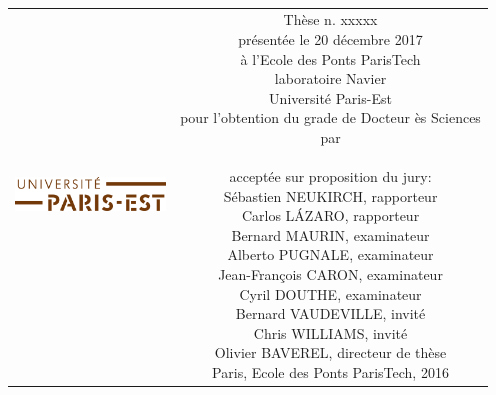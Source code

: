 \begin{titlepage}
\begin{center}


\null\vspace{2cm}
{
{\ttfamily\huge \mytitle} \\[24pt] 
}    
\vfill

\begin{tabular} {cc}
\parbox{0.3\textwidth}{\includegraphics[width=4cm]{head/logo_upe}}
&
\parbox{0.7\textwidth}{%
	Thèse n. xxxxx\\
	présentée le 20 décembre 2017\\
	à l'Ecole des Ponts ParisTech\\
	laboratoire Navier\\
%
	Université Paris-Est\\[6pt]
	pour l'obtention du grade de Docteur ès Sciences\\
	par\\ [4pt]
	\null \hspace{3em} \myauthor\\[9pt]
%
\small
acceptée sur proposition du jury:\\[4pt]
%
    Sébastien NEUKIRCH, rapporteur\\
    Carlos LÁZARO, rapporteur\\
    Bernard MAURIN, examinateur\\
    Alberto PUGNALE, examinateur\\
    Jean-François CARON, examinateur\\
    Cyril DOUTHE, examinateur\\
    Bernard VAUDEVILLE, invité\\
    Chris WILLIAMS, invité\\
    Olivier BAVEREL, directeur de thèse\\[12pt]
%
Paris, Ecole des Ponts ParisTech, 2016}
\end{tabular}
\end{center}
\vspace{2cm}
\end{titlepage}



